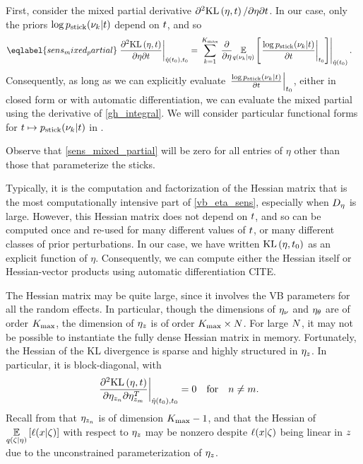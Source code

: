 First, consider the mixed partial derivative $\partial^2 \mathrm{KL}\left(\eta, t\right) /
\partial \eta \partial t$.  In our case, only the priors $\log p_{\mathrm{stick}}(\nu_{k}
\vert t)$ depend on $t$, and so
%
\begin{align}\eqlabel{sens_mixed_partial}
%
\fracat{\partial^2 \KL{\eta, \t}}
       {\partial \eta \partial \t}
       {\etaopt(\t_0), \t_0} ={}&
\sum_{\k=1}^{\kmax}
    \evalat{
        \frac{\partial}{\partial\eta}
        \expect{\q(\nuk \vert \eta)}
               {\fracat{\log \pstick(\nuk \vert \t)}{\partial \t}{\t_0}
               }
        }
        {\etaopt(\t_0)}.
%
\end{align}
%
Consequently, as long as we can explicitly evaluate $\left.\frac{\log p_{\mathrm{stick}}(\nu_{k}
\vert t)}{\partial t}\right\vert_{t_0} $, either in closed form or with automatic
differentiation, we can evaluate the mixed partial using the derivative of
\eqref{gh_integral}.  We will consider particular functional forms for
$t \mapsto p_{\mathrm{stick}}(\nu_{k} \vert t)$ in .

Observe that \eqref{sens_mixed_partial} will be zero for all entries of
$\eta$ other than those that parameterize the sticks.

Typically, it is the computation and factorization of the Hessian matrix that is
the most computationally intensive part of \eqref{vb_eta_sens}, especially when
${D_{\eta}}$ is large.  However, this Hessian matrix does not depend on $t$, and
so can be computed once and re-used for many different values of $t$, or many
different classes of prior perturbations.  In our case, we have written
$\mathrm{KL}\left(\eta, t_0\right)$ as an explicit function of $\eta$.  Consequently, we can
compute either the Hessian itself or Hessian-vector products using automatic
differentiation CITE.

The Hessian matrix may be quite large, since it involves the VB parameters for
all the random effects.  In particular, though the dimensions of $\eta_{\nu}$ and
$\eta_{\theta}$ are of order ${K_{\mathrm{max}}}$, the dimension of $\eta_{z}$ is of order ${K_{\mathrm{max}}}
\times N$.  For large $N$, it may not be possible to instantiate the fully
dense Hessian matrix in memory.  Fortunately, the Hessian of the KL divergence
is sparse and highly structured in $\eta_{z}$.  In particular, it is
block-diagonal, with
%
\begin{align*}
%
\fracat{\partial^2 \KL{\eta, \t}}
       {\partial \eta_{\z_{n}} \partial \eta_{\z_{m}}^T}
       {\etaopt(\t_0), \t_0} ={}& 0 \mathtxt{for}n\ne m.
%
\end{align*}
%
Recall from  that $\eta_{z_n}$ is of dimension ${K_{\mathrm{max}}} -
1$, and that the Hessian of $\underset{q(\zeta \vert \eta)}{\mathbb{E}}\left[\ell(x \vert
\zeta)\right]$ with respect to $\eta_{z}$ may be nonzero despite $\ell(x \vert \zeta)$
being linear in $z$ due to the unconstrained parameterization of $\eta_{z}$.

